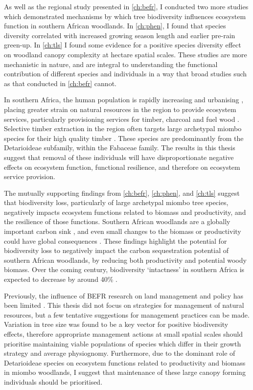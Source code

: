 \begin{refsection}
As well as the regional study presented in \autoref{ch:befr}, I conducted two more studies which demonstrated mechanisms by which tree biodiversity influences ecosystem function in southern African woodlands. In \autoref{ch:phen}, I found that species diversity correlated with increased growing season length and earlier pre-rain green-up. In \autoref{ch:tls} I found some evidence for a positive species diversity effect on woodland canopy complexity at hectare spatial scales. These studies are more mechanistic in nature, and are integral to understanding the functional contribution of different species and individuals in a way that broad studies such as that conducted in \autoref{ch:befr} cannot. 

In southern Africa, the human population is rapidly increasing and urbanising \citep{UN2018}, placing greater strain on natural resources in the region to provide ecosystem services, particularly provisioning services for timber, charcoal and fuel wood \citep{Wessels2013, Ryan2016}. Selective timber extraction in the region often targets large archetypal miombo species for their high quality timber \citep{Sitoe2010}. These species are predominantly from the Detarioideae subfamily, within the Fabaceae family. The results in this thesis suggest that removal of these individuals will have disproportionate negative effects on ecosystem function, functional resilience, and therefore on ecosystem service provision. 

The mutually supporting findings from \autoref{ch:befr}, \autoref{ch:phen}, and \autoref{ch:tls} suggest that biodiversity loss, particularly of large archetypal miombo tree species, negatively impacts ecosystem functions related to biomass and productivity, and the resilience of those functions. Southern African woodlands are a globally important carbon sink \citep{Grace2006, Pelletier2018}, and even small changes to the biomass or productivity could have global consequences \citep{Williams2005}. These findings highlight the potential for biodiversity loss to negatively impact the carbon sequestration potential of southern African woodlands, by reducing both productivity and potential woody biomass. Over the coming century, biodiversity `intactness' in southern Africa is expected to decrease by around 40\% \citep{Biggs2008}.

Previously, the influence of BEFR research on land management and policy has been limited \citep{Manning2019}. This thesis did not focus on strategies for management of natural resources, but a few tentative suggestions for management practices can be made. Variation in tree size was found to be a key vector for positive biodiversity effects, therefore appropriate management actions at small spatial scales should prioritise maintaining viable populations of species which differ in their growth strategy and average physiognomy. Furthermore, due to the dominant role of Detarioideae species on ecosystem functions related to productivity and biomass in miombo woodlands, I suggest that maintenance of these large canopy forming individuals should be prioritised.


\end{refsection}
